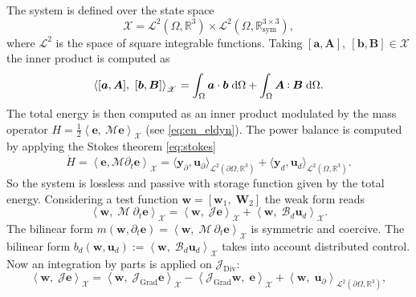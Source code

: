 \documentclass{svjour3}                     %
\DeclareMathOperator*{\Grad}{Grad}
\DeclareMathOperator*{\Div}{Div}
\def\onedot{$\mathsurround0pt\ldotp$}
\def\cddot{%
	\mathbin{\vcenter{\baselineskip.67ex
			\hbox{\onedot}\hbox{\onedot}}%
}}
\begin{document}
The system is defined over the state space
\[
\mathscr{X} = \mathscr{L}^2(\Omega, \mathbb{R}^3) \times\mathscr{L}^2(\Omega, \mathbb{R}^{3\times 3}_{\text{sym}}),
\]
where $\mathscr{L}^2$ is the space of square integrable functions. Taking  $[\bm{a}, \bm{A}], \ [\bm{b}, \bm{B}] \in \mathscr{X}$ the inner product is computed as
\[
\left\langle [\bm{a}, \bm{A}], \ [\bm{b}, \bm{B}] \right\rangle_{\mathscr{X}} = \int_{\Omega} \bm{a} \cdot \bm{b} \d{\Omega} + \int_{\Omega} \bm{A} \cddot \bm{B} \d{\Omega}.
\]
The total energy is then computed as an inner product modulated by the mass operator $H = \frac{1}{2} \left\langle \bm{e}, \ \bm{\mathcal{M}} \bm{e} \right\rangle_{\mathscr{X}}$ (see \eqref{eq:en_eldyn}). The power balance is computed by applying the Stokes theorem \eqref{eq:stokes}
\begin{equation}
\label{eq:pow_eldyn}
\dot{H} = \left\langle \bm{e},  \bm{\mathcal{M}} \partial_t \bm{e} \right\rangle_{\mathscr{X}} = \langle \bm{y}_\partial,  \bm{u}_\partial \rangle_{\mathscr{L}^2(\partial\Omega, \mathbb{R}^3)} + \langle \bm{y}_d,  \bm{u}_d \rangle_{\mathscr{L}^2(\Omega, \mathbb{R}^3)}.
\end{equation}
So the system is lossless and passive with storage function given by the total energy. Considering a test function $\bm{w} = [\bm{w}_1, \; \bm{W}_2]$ the weak form reads
\begin{equation*}
\left\langle \bm{w}, \; \bm{\mathcal{M}} \ \partial_t \bm{e} \right\rangle_{\mathscr{X}} = \left\langle \bm{w}, \; \bm{\mathcal{J}} \bm{e} \right\rangle_{\mathscr{X}} + \left\langle \bm{w}, \; \bm{\mathcal{B}}_d \bm{u}_d \right\rangle_{\mathscr{X}}.
\end{equation*}
The bilinear form $m(\bm{w}, \partial_t \bm{e}) = \left\langle \bm{w}, \; \bm{\mathcal{M}} \ \partial_t \bm{e} \right\rangle_{\mathscr{X}}$ is symmetric and coercive. The bilinear form $b_d(\bm{w}, \bm{u}_d):=\left\langle \bm{w}, \; \bm{\mathcal{B}}_d \bm{u}_d \right\rangle_{\mathscr{X}}$ takes into account distributed control.\\
Now an integration by parts is applied on $\bm{\mathcal{J}}_{\Div}$:
\begin{equation}
\left\langle \bm{w}, \; \bm{\mathcal{J}} \bm{e} \right\rangle_{\mathscr{X}} = \left\langle \bm{w}, \; \bm{\mathcal{J}}_{\Grad} \bm{e} \right\rangle_{\mathscr{X}} - \left\langle \bm{\mathcal{J}}_{\Grad} \bm{w}, \; \bm{e} \right\rangle_{\mathscr{X}} + \left\langle \bm{w}, \; \bm{u}_\partial \right\rangle_{\mathscr{L}^2(\partial \Omega, \mathbb{R}^3)},
\end{equation}
\end{document}
